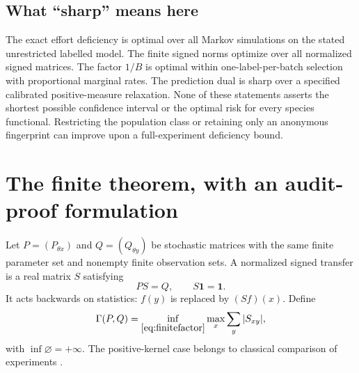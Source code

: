 \documentclass[11pt]{article}
\numberwithin{equation}{section}
\theoremstyle{definition}
\theoremstyle{remark}
\newcommand{\ind}{\mathbf1}\newcommand{\Prob}{\mathcal P}\newcommand{\Ee}{\mathcal E}\newcommand{\Ff}{\mathcal F}
\begin{document}
\subsection{What ``sharp'' means here}
The exact effort deficiency is optimal over all Markov simulations on the stated unrestricted labelled model. The finite signed norms optimize over all normalized signed matrices. The factor $1/B$ is optimal within one-label-per-batch selection with proportional marginal rates. The prediction dual is sharp over a specified calibrated positive-measure relaxation. None of these statements asserts the shortest possible confidence interval or the optimal risk for every species functional. Restricting the population class or retaining only an anonymous fingerprint can improve upon a full-experiment deficiency bound.

\section{The finite theorem, with an audit-proof formulation}\label{sec:finite}
Let $P=(P_{\theta x})$ and $Q=(Q_{\theta y})$ be stochastic matrices with the same finite parameter set and nonempty finite observation sets. A normalized signed transfer is a real matrix $S$ satisfying
\begin{equation}\label{eq:finitefactor}
 PS=Q,\qquad S\ind=\ind.
\end{equation}
It acts backwards on statistics: $f(y)$ is replaced by $(Sf)(x)$. Define
\begin{equation}\label{eq:gamma}
 \Gamma(P,Q)=\inf_{\eqref{eq:finitefactor}}\max_x\sum_y|S_{xy}|,
\end{equation}
with $\inf\varnothing=+\infty$. The positive-kernel case belongs to classical
comparison of experiments \cite{Blackwell1953,Torgersen1991}.
\end{document}
